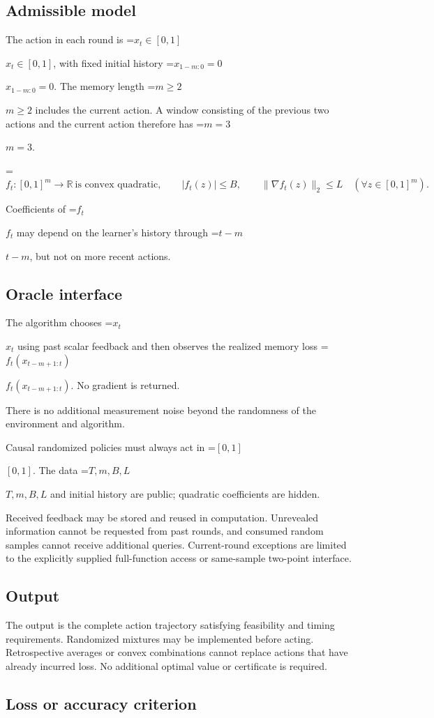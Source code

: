 \documentclass[10pt,a4paper]{article}
\newcommand{\AtlasMath}[1]{\par\begingroup\centering\setbox0=\hbox{$\displaystyle #1$}\ifdim\wd0>1.4\linewidth\typeout{ATLAS WIDE FORMULA: \the\wd0}\fi\ifdim\wd0>\linewidth\resizebox{\linewidth}{!}{\box0}\else\box0\fi\par\endgroup}
\newcommand{\AtlasInlineMath}[1]{\begingroup\setbox0=\hbox{$#1$}\ifdim\wd0>.4\linewidth\endgroup\AtlasMath{#1}\else\endgroup$#1$\fi}
\begin{document}
\subsection{Admissible model}
The action in each round is \AtlasInlineMath{x_t\in[0,1]}, with fixed initial history \AtlasInlineMath{x_{1-m:0}=0}. The memory length \AtlasInlineMath{m\ge2} includes the current action. A window consisting of the previous two actions and the current action therefore has \AtlasInlineMath{m=3}.


\AtlasMath{f_t:[0,1]^m\to\mathbb R\ \text{is convex quadratic},\qquad |f_t(z)|\le B,\qquad \|\nabla f_t(z)\|_2\le L\quad(\forall z\in[0,1]^m).}


Coefficients of \AtlasInlineMath{f_t} may depend on the learner's history through \AtlasInlineMath{t-m}, but not on more recent actions.

\subsection{Oracle interface}
The algorithm chooses \AtlasInlineMath{x_t} using past scalar feedback and then observes the realized memory loss \AtlasInlineMath{f_t(x_{t-m+1:t})}. No gradient is returned.

There is no additional measurement noise beyond the randomness of the environment and algorithm.

Causal randomized policies must always act in \AtlasInlineMath{[0,1]}. The data \AtlasInlineMath{T,m,B,L} and initial history are public; quadratic coefficients are hidden.

Received feedback may be stored and reused in computation. Unrevealed information cannot be requested from past rounds, and consumed random samples cannot receive additional queries. Current-round exceptions are limited to the explicitly supplied full-function access or same-sample two-point interface.

\subsection{Output}
The output is the complete action trajectory satisfying feasibility and timing requirements. Randomized mixtures may be implemented before acting. Retrospective averages or convex combinations cannot replace actions that have already incurred loss. No additional optimal value or certificate is required.

\subsection{Loss or accuracy criterion}
\end{document}
